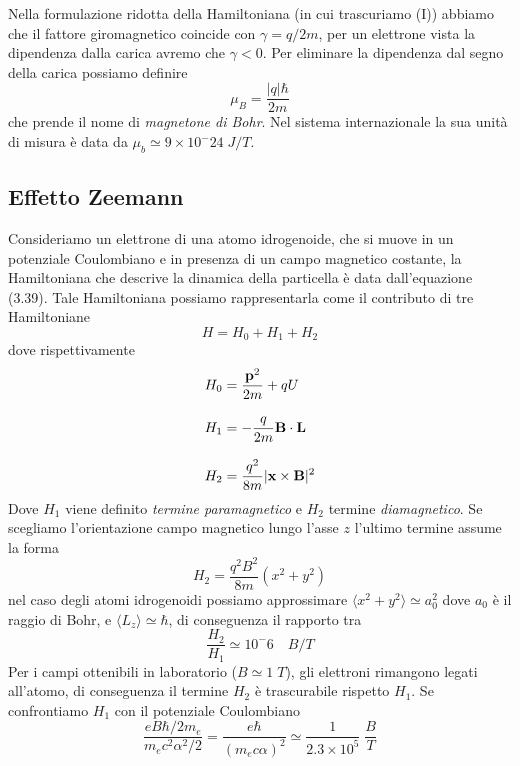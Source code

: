 Nella formulazione ridotta della Hamiltoniana (in cui trascuriamo (I)) abbiamo che il fattore giromagnetico coincide con $\gamma = q /2m$, per un elettrone vista la dipendenza dalla carica avremo che $\gamma <0$. Per eliminare la dipendenza dal segno della carica possiamo definire 
\begin{equation*}
	\mu_B = \frac{|q|\hbar}{2m}
\end{equation*}
che prende il nome di \textit{magnetone di Bohr}. Nel sistema internazionale la sua unit\`a di misura \`e data da $\mu_b \simeq 9 \times 10^-24 \;  J/T $.
\newpage 
\subsection{Effetto Zeemann}

Consideriamo un elettrone di una atomo idrogenoide, che si muove in un potenziale Coulombiano e in presenza di un campo magnetico costante, la Hamiltoniana che descrive la dinamica della particella \`e data dall'equazione (3.39). Tale Hamiltoniana possiamo rappresentarla come il contributo di tre Hamiltoniane
\begin{equation*}
	H = H_0 + H_1 + H_2
\end{equation*}
dove rispettivamente 
\begin{align*}
	& H_0 = \frac{\bold{p}^2}{2m} + qU \\[0.3cm]
	& H_1 = -\frac{q}{2m}\bold{B} \cdot \bold{L} \\[0.3cm]
	& H_2 = \frac{q^2}{8m}|\bold{x} \times \bold{B}|^2 
\end{align*}
Dove $H_1$ viene definito \textit{termine paramagnetico} e $H_2$ termine \textit{diamagnetico}. Se scegliamo l'orientazione campo magnetico lungo l'asse $z$ l'ultimo termine assume la forma
\begin{equation*}
	H_2 = \frac{q^2B^2}{8m}(x^2+y^2)
\end{equation*}
nel caso degli atomi idrogenoidi possiamo approssimare $\langle x^2 + y^2\rangle \simeq a_0^2$ dove $a_0$ \`e il raggio di Bohr, e $\langle L_z \rangle \simeq \hbar$, di conseguenza il rapporto tra 
\begin{equation*}
\frac{H_2}{H_1} \simeq 10^-6 \quad  B/T 
\end{equation*}
Per i campi ottenibili in laboratorio ($B \simeq 1  \; T$), gli elettroni rimangono legati all'atomo, di conseguenza il termine $H_2$ \`e trascurabile rispetto $H_1$. Se confrontiamo $H_1$ con il potenziale Coulombiano
\begin{equation*}
	\frac{eB\hbar/2m_e}{m_ec^2\alpha^2/2} = \frac{e\hbar}{(m_ec\alpha)^2} \simeq \frac{1}{2.3 \times 10^5} \;\frac{B}{T}
\end{equation*}
